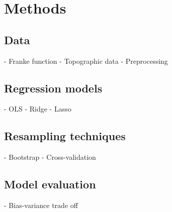 \section{Methods}\label{sec:methods}

\subsection{Data}\label{ssec:data}
- Franke function
- Topographic data
- Preprocessing


\subsection{Regression models}\label{ssec:regression_models}
- OLS
- Ridge
- Lasso

\subsection{Resampling techniques}\label{ssec:resampling_techniques}
- Bootstrap
- Cross-validation

\subsection{Model evaluation}\label{ssec:evaluation}
- Bias-variance trade off